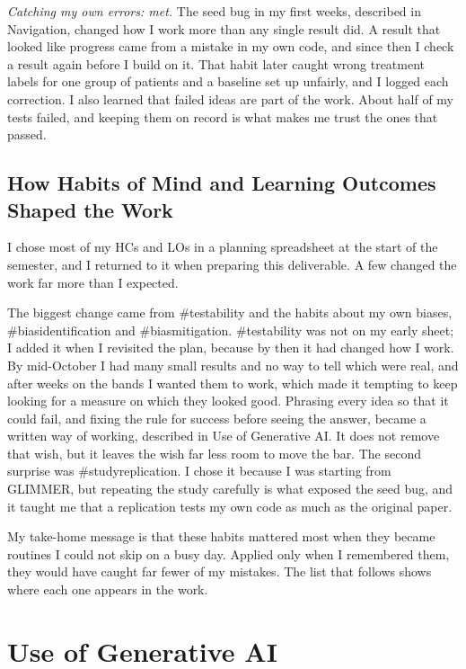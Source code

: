 \textit{Catching my own errors: met.} The seed bug in my first weeks, described in Navigation, changed how I work more than any single result did. A result that looked like progress came from a mistake in my own code, and since then I check a result again before I build on it. That habit later caught wrong treatment labels for one group of patients and a baseline set up unfairly, and I logged each correction. I also learned that failed ideas are part of the work. About half of my tests failed, and keeping them on record is what makes me trust the ones that passed.

\subsection{How Habits of Mind and Learning Outcomes Shaped the Work}

I chose most of my HCs and LOs in a planning spreadsheet at the start of the semester, and I returned to it when preparing this deliverable. A few changed the work far more than I expected.

The biggest change came from \#testability and the habits about my own biases, \#biasidentification and \#biasmitigation. \#testability was not on my early sheet; I added it when I revisited the plan, because by then it had changed how I work. By mid-October I had many small results and no way to tell which were real, and after weeks on the bands I wanted them to work, which made it tempting to keep looking for a measure on which they looked good. Phrasing every idea so that it could fail, and fixing the rule for success before seeing the answer, became a written way of working, described in Use of Generative AI. It does not remove that wish, but it leaves the wish far less room to move the bar. The second surprise was \#studyreplication. I chose it because I was starting from GLIMMER, but repeating the study carefully is what exposed the seed bug, and it taught me that a replication tests my own code as much as the original paper.

My take-home message is that these habits mattered most when they became routines I could not skip on a busy day. Applied only when I remembered them, they would have caught far fewer of my mistakes. The list that follows shows where each one appears in the work.

\section{Use of Generative AI}

